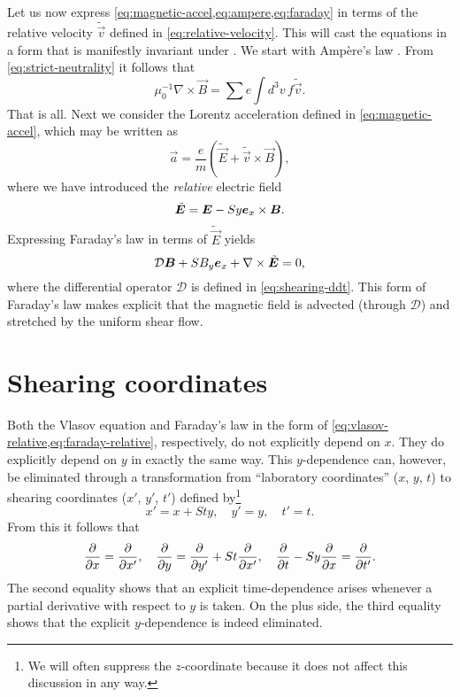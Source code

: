 \documentclass[aps,pre,notitlepage,amsmath,amssymb,amsfonts,nobibnotes,nofootinbib,superscriptaddress,onecolumn,a4paper,10pt]{revtex4-1}
\newcommand{\tvec}[1]{\tilde{\vec{#1}}}
\begin{document}
Let us now express \cref{eq:magnetic-accel,eq:ampere,eq:faraday} in terms of
the relative velocity $\tvec{v}$ defined in \cref{eq:relative-velocity}. This
will cast the equations in a form that is manifestly invariant under
. We start with Ampère's law
. From \cref{eq:strict-neutrality} it follows that
\begin{equation}
  \mu_0^{-1}\nabla\times\vec{B} = \sum e\int\!d^3v\,f\tvec{v}.
\end{equation}
That is all. Next we consider the Lorentz acceleration defined in
\cref{eq:magnetic-accel}, which may be written as
\begin{equation}
  \vec{a} = \frac{e}{m}(\tvec{E} + \tvec{v}\times\vec{B}),
\end{equation}
where we have introduced the \emph{relative} electric field
\begin{equation}
  \tvec{E} = \vec{E} - Sy\ex\times\vec{B}.
\end{equation}
Expressing Faraday's law  in terms of $\tvec{E}$ yields
\begin{equation}
  \label{eq:faraday-relative}
  \mathcal{D}\vec{B} + SB_y\ex + \nabla\times\tvec{E} = 0,
\end{equation}
where the differential operator $\mathcal{D}$ is defined in
\cref{eq:shearing-ddt}. This form of Faraday's law makes explicit that the
magnetic field is advected (through $\mathcal{D}$) and stretched by the
uniform shear flow.

\section{Shearing coordinates}\label{sec:shearing-coordinates}

Both the Vlasov equation and Faraday's law in the form of
\cref{eq:vlasov-relative,eq:faraday-relative}, respectively, do not explicitly
depend on $x$. They do explicitly depend on $y$ in exactly the same way. This
$y$-dependence can, however, be eliminated through a transformation from
``laboratory coordinates'' ($x$, $y$, $t$) to shearing coordinates ($x'$,
$y'$, $t'$) defined by\footnote{We will often suppress the $z$-coordinate
  because it does not affect this discussion in any way.}
\begin{equation}
  \label{eq:shearing-coordinates}
  x' = x + Sty,\quad y' = y,\quad t' = t.
\end{equation}
From this it follows that
\begin{equation}
  \frac{\partial}{\partial x} = \frac{\partial}{\partial x'},\quad
  \frac{\partial}{\partial y} = \frac{\partial}{\partial y'} + St\frac{\partial}{\partial x'},\quad
  \frac{\partial}{\partial t} - Sy\frac{\partial}{\partial x} = \frac{\partial}{\partial t'}.
\end{equation}
The second equality shows that an explicit time-dependence arises whenever a
partial derivative with respect to $y$ is taken. On the plus side, the third
equality shows that the explicit $y$-dependence is indeed eliminated.
\end{document}
